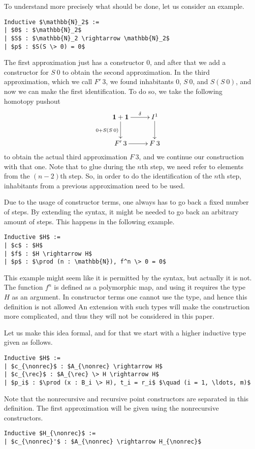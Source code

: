 \documentclass[a4paper,UKenglish]{lipics-v2016}
\newcommand{\one}[0]{\textbf{1}}
\newcommand{\rec}[0]{\operatorname{rec}}
\newcommand{\nonrec}[0]{\operatorname{nonrec}}
\begin{document}
To understand more precisely what should be done, let us consider an example.
\lstset{language=Coq}
\begin{lstlisting}
Inductive $\mathbb{N}_2$ :=
| $0$ : $\mathbb{N}_2$
| $S$ : $\mathbb{N}_2 \rightarrow \mathbb{N}_2$
| $p$ : $S(S \> 0) = 0$
\end{lstlisting}
The first approximation just has a constructor $0$, and after that we add a constructor for $S \> 0$ to obtain the second approximation.
In the third approximation, which we call $F' \> 3$, we found inhabitants $0$, $S \> 0$, and $S(S \> 0)$, and now we can make the first identification.
To do so, we take the following homotopy pushout
\[
\xymatrix
{
	\one + \one \ar[d]_{0 + S(S \> 0)} \ar[r]^-{\delta} & I^1 \ar[d]\\
	F' \> 3\ar[r] & F \> 3
}
\]
to obtain the actual third approximation $F \> 3$, and we continue our construction with that one.
Note that to glue during the $n$th step, we need refer to elements from the $(n-2)$th step.
So, in order to do the identification of the $n$th step, inhabitants from a previous approximation need to be used.

Due to the usage of constructor terms, one always has to go back a fixed number of steps.
By extending the syntax, it might be needed to go back an arbitrary amount of steps.
This happens in the following example.
\lstset{language=Coq}
\begin{lstlisting}
Inductive $H$ :=
| $c$ : $H$
| $f$ : $H \rightarrow H$
| $p$ : $\prod (n : \mathbb{N}), f^n \> 0 = 0$
\end{lstlisting}
This example might seem like it is permitted by the syntax, but actually it is not.
The function $f^n$ is defined as a polymorphic map, and using it requires the type $H$ as an argument.
In constructor terms one cannot use the type, and hence this definition is not allowed
An extension with such types will make the construction more complicated, and thus they will not be considered in this paper.

Let us make this idea formal, and for that we start with a higher inductive type given as follows.
\lstset{language=Coq}
\begin{lstlisting}[label={lst:HIT}]
Inductive $H$ :=
| $c_{\nonrec}$ : $A_{\nonrec} \rightarrow H$
| $c_{\rec}$ : $A_{\rec} \> H \rightarrow H$
| $p_i$ : $\prod (x : B_i \> H), t_i = r_i$ $\quad (i = 1, \ldots, m)$
\end{lstlisting}
Note that the nonrecursive and recursive point constructors are separated in this definition.
The first approximation will be given using the nonrecursive constructors.
\lstset{language=Coq}
\begin{lstlisting}
Inductive $H_{\nonrec}$ :=
| $c_{\nonrec}'$ : $A_{\nonrec} \rightarrow H_{\nonrec}$
\end{lstlisting}
\end{document}
